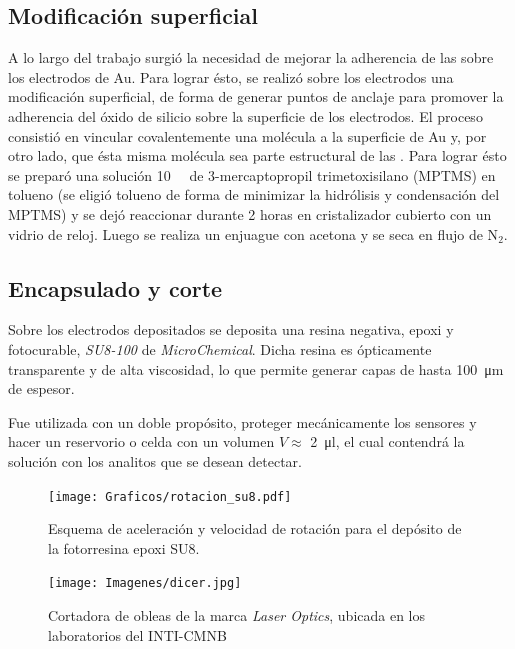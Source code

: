 	\subsection{Modificación superficial}\label{sec:silanizacion}
		
		A lo largo del trabajo surgió la necesidad de mejorar la adherencia de las \pdm\space sobre los electrodos de Au. Para lograr ésto, se realizó sobre los electrodos una modificación superficial, de forma de generar puntos de anclaje para promover la adherencia del óxido de silicio sobre la superficie de los electrodos.
		El proceso consistió en vincular covalentemente una molécula a la superficie de Au y, por otro lado, que ésta misma molécula sea parte estructural de las \pdm. Para lograr ésto se preparó una solución \SI{10}{\milli\Molar} de 3-mercaptopropil trimetoxisilano (MPTMS) en tolueno (se eligió tolueno de forma de minimizar la hidrólisis y condensación del MPTMS) y se dejó reaccionar durante 2 horas en cristalizador cubierto con un vidrio de reloj. \cite{Goss1991,Herzog2013} Luego se realiza un enjuague con acetona y se seca en flujo de N$_2$.

	\subsection{Encapsulado y corte}\label{sec:corte}

		Sobre los electrodos depositados se deposita una resina negativa, epoxi y fotocurable, \textit{SU8-100} de \textit{MicroChemical}\cite{MicrochemicalsTeam2009}. Dicha resina es ópticamente transparente y de alta viscosidad, lo que permite generar capas de hasta \SI{100}{\um} de espesor. 

		Fue utilizada con un doble propósito, proteger mecánicamente los sensores y hacer un reservorio o celda con un volumen  $V \approx$ \SI{2}{\ul}, el cual contendrá la solución con los analitos que se desean detectar.  
			\begin{figure}[t!]
			 		  \begin{center}
			 		  \texttt{[image: Graficos/rotacion\_su8.pdf]}
			 		  \caption[Parámetros de depósito para la resina epoxi]{Esquema de aceleración y velocidad de rotación para el depósito de la fotorresina epoxi SU8.}
			 		  \label{fig:spin-su8}
			 		  \end{center}
			 		  \end{figure}
			
			\begin{figure}[b!]
			 		  \begin{center}
			 		  \texttt{[image: Imagenes/dicer.jpg]}
			 		  \caption[Cortadora de obleas]{Cortadora de obleas de la marca \textit{Laser Optics}, ubicada en los laboratorios del INTI-CMNB}
			 		  \label{fig:dicer}
			 		  \end{center}
			 		  \end{figure}
		

